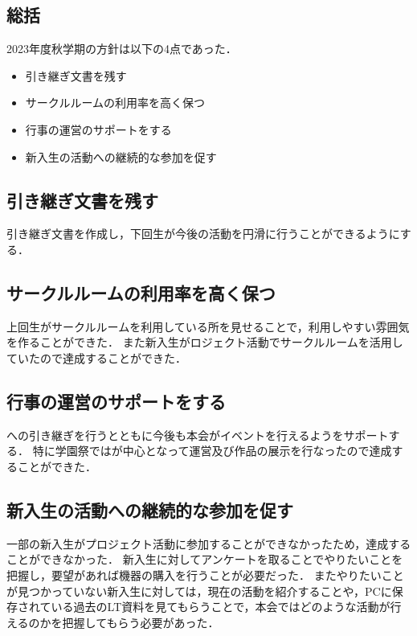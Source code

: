 \subsection*{\thirdGrade{}総括}


2023年度秋学期の\thirdGrade{}方針は以下の4点であった．

\begin{itemize}
    \item 引き継ぎ文書を残す
    \item サークルルームの利用率を高く保つ
    \item 行事の運営のサポートをする
    \item 新入生の活動への継続的な参加を促す
\end{itemize}

\subsection*{引き継ぎ文書を残す}
引き継ぎ文書を作成し，下回生が今後の活動を円滑に行うことができるようにする．

\subsection*{サークルルームの利用率を高く保つ}
上回生がサークルルームを利用している所を見せることで，利用しやすい雰囲気を作ることができた．
また新入生がロジェクト活動でサークルルームを活用していたので達成することができた．

\subsection*{行事の運営のサポートをする}
\secondGrade{}への引き継ぎを行うとともに今後も本会がイベントを行えるよう\secondGrade{}をサポートする．
特に学園祭では\secondGrade{}が中心となって運営及び作品の展示を行なったので達成することができた．

\subsection*{新入生の活動への継続的な参加を促す}
一部の新入生がプロジェクト活動に参加することができなかったため，達成することができなかった．
新入生に対してアンケートを取ることでやりたいことを把握し，要望があれば機器の購入を行うことが必要だった．
またやりたいことが見つかっていない新入生に対しては，現在の活動を紹介することや，PCに保存されている過去のLT資料を見てもらうことで，本会ではどのような活動が行えるのかを把握してもらう必要があった．
